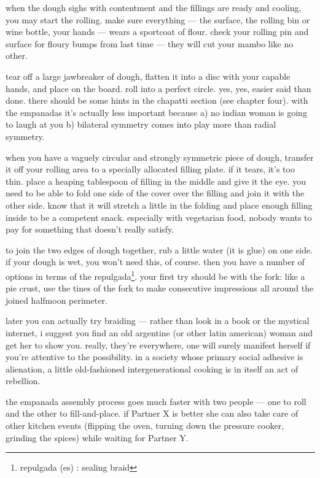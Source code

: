 when the dough sighs with contentment and the fillings are ready and
cooling, you may start the rolling. make sure everything --- the
surface, the rolling bin or wine bottle, your hands --- wears a
sportcoat of flour. check your rolling pin and surface for floury
bumps from last time --- they will cut your mambo like no other.

tear off a large jawbreaker of dough, flatten it into a disc with your
capable hands, and place on the board. roll into a perfect
circle. yes, yes, easier said than done. there should be some hints in
the chapatti section (see chapter four). with the empanadas it's
actually less important because a) no indian woman is going to laugh
at you b) bilateral symmetry comes into play more than radial
symmetry.

when you have a vaguely circular and strongly symmetric piece of
dough, transfer it off your rolling area to a specially allocated
filling plate. if it tears, it's too thin. place a heaping tablespoon
of filling in the middle and give it the eye. you need to be able to
fold one side of the cover over the filling and join it with the other
side. know that it will stretch a little in the folding and place
enough filling inside to be a competent snack. especially with
vegetarian food, nobody wants to pay for something that doesn't really
satisfy.

to join the two edges of dough together, rub a little water (it is
glue) on one side. if your dough is wet, you won't need this, of
course. then you have a number of options in terms of the
repulgada\footnote{repulgada (es) : sealing braid}. your first try
should be with the fork: like a pie crust, use the tines of the fork
to make consecutive impressions all around the joined halfmoon
perimeter.

later you can actually try braiding --- rather than look in a book or
the mystical internet, i suggest you find an old argentine (or other
latin american) woman and get her to show you. really, they're
everywhere, one will surely manifest herself if you're attentive to
the possibility. in a society whose primary social adhesive is
alienation, a little old-fashioned intergenerational cooking is in
itself an act of rebellion.

the empanada assembly process goes much faster with two people --- one
to roll and the other to fill-and-place. if Partner X is better she
can also take care of other kitchen events (flipping the oven, turning
down the pressure cooker, grinding the spices) while waiting for
Partner Y.

